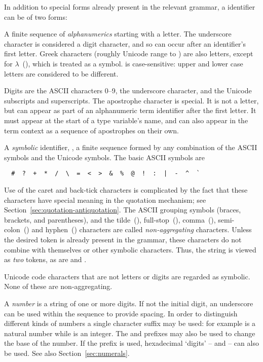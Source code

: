 In addition to special forms already present in the relevant grammar,
a \HOL{} identifier can be of two forms:
\begin{myenumerate}
\item A finite sequence of \emph{alphanumerics} starting with a letter.  The
  underscore character is considered a digit character, and so can
  occur after an identifier's first letter.  Greek characters (roughly
  Unicode range  to ) are also letters, except for
  $\lambda$~(), which is treated as a symbol. \HOL{} is
  case-sensitive: upper and lower case letters are considered to be
  different.

  Digits are the ASCII characters 0--9, the underscore character, and
  the Unicode subscripts and superscripts.  The apostrophe character
  is special.%
  It is not a letter, but can appear as part of an alphanumeric term
  identifier after the first letter.  It must appear at the start of a
  type variable's name, and can also appear in the term context as a
  sequence of apostrophes on their own.

\item A \emph{symbolic} identifier, \ie, a finite sequence formed by
  any combination of the ASCII symbols and the Unicode symbols.  The
  basic ASCII symbols are
\begin{verbatim}
  #  ?  +  *  /  \  =  <  >  &  %  @  !  :  |  -  ^  `
\end{verbatim}
  Use of the caret and back-tick characters is complicated by the fact
  that these characters have special meaning in the quotation
  mechanism; see Section~\ref{sec:quotation-antiquotation}.  The ASCII
  grouping symbols (braces, brackets, and parentheses), and the
  tilde~(), full-stop~(),
  comma~(\holtxt{,}), semi-colon~(\holtxt{;}) and hyphen~(\holtxt{-})
  characters are called \emph{non-aggregating} characters. %
%
%
  Unless the desired token is already present in the grammar, these
  characters do not combine with themselves or other symbolic
  characters.  Thus, the string  is viewed as \emph{two}
  tokens, as are  and .

  Unicode code characters that are not letters or digits are regarded
  as symbolic.  None of these are non-aggregating.

\item A \emph{number} is a string of one or more digits. If not the
  initial digit, an underscore can be used within the sequence to
  provide spacing. In order to distinguish different kinds of numbers
  a single character suffix may be used: for example  is a
  natural number while  is an integer.  The  and
   prefixes may also be used to change the base of the
  number. If the  prefix is used, hexadecimal `digits'
  -- and -- can also be
  used. See also Section~\ref{sec:numerals}.%
\end{myenumerate}
